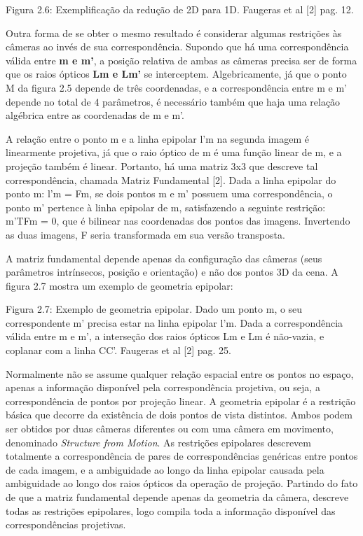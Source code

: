 Figura 2.6: Exemplificação da redução de 2D para 1D. Faugeras et al [2] pag. 12.

Outra forma de se obter o mesmo resultado é considerar algumas restrições às câmeras ao invés de sua correspondência. Supondo que há uma correspondência válida entre \textbf{m e m’}, a posição relativa de ambas as câmeras precisa ser de forma que os raios ópticos \textbf{Lm e Lm’} se interceptem. Algebricamente, já que o ponto M da figura 2.5 depende de três coordenadas, e a correspondência entre m e m’ depende no total de 4 parâmetros, é necessário também que haja uma relação algébrica entre as coordenadas de m e m’.

A relação entre o ponto m e a linha epipolar l’m na segunda imagem é linearmente projetiva, já que o raio óptico de m é uma função linear de m, e a projeção também é linear. Portanto, há uma matriz 3x3 que descreve tal correspondência, chamada Matriz Fundamental [2]. Dada a linha epipolar do ponto m: l’m = Fm, se dois pontos m e m’ possuem uma correspondência, o ponto m’ pertence à linha epipolar de m, satisfazendo a seguinte restrição: 
m’TFm = 0, que é bilinear nas coordenadas dos pontos das imagens. Invertendo as duas imagens, F seria transformada em sua versão transposta.

A matriz fundamental depende apenas da configuração das câmeras (seus parâmetros intrínsecos, posição e orientação) e não dos pontos 3D da cena. A figura 2.7 mostra um exemplo de geometria epipolar:

Figura 2.7: Exemplo de geometria epipolar. Dado um ponto m, o seu correspondente m’ precisa estar na linha epipolar l’m. Dada a correspondência válida entre m e m’, a interseção dos raios ópticos Lm e Lm é não-vazia, e coplanar com a linha CC’. Faugeras et al [2] pag. 25.

Normalmente não se assume qualquer relação espacial entre os pontos no espaço, apenas a informação disponível pela correspondência projetiva, ou seja, a correspondência de pontos por projeção linear. A geometria epipolar é a restrição básica que decorre da existência de dois pontos de vista distintos. Ambos podem ser obtidos por duas câmeras diferentes ou com uma câmera em movimento, denominado \textit{Structure from Motion}. As restrições epipolares descrevem totalmente a correspondência de pares de correspondências genéricas entre pontos de cada imagem, e a ambiguidade ao longo da linha epipolar causada pela ambiguidade ao longo dos raios ópticos da operação de projeção. Partindo do fato de que a matriz fundamental depende apenas da geometria da câmera, descreve todas as restrições epipolares, logo compila toda a informação disponível das correspondências projetivas. 

